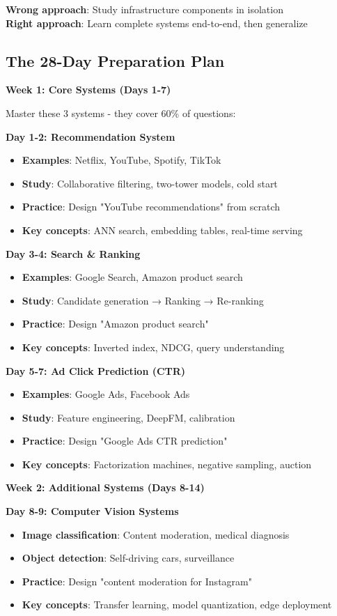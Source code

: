 \documentclass[10pt]{article}
\begin{document}
\textbf{Wrong approach}: Study infrastructure components in isolation \\
\textbf{Right approach}: Learn complete systems end-to-end, then generalize

\subsection{The 28-Day Preparation Plan}

\textbf{Week 1: Core Systems (Days 1-7)}

Master these 3 systems - they cover 60\% of questions:

\textbf{Day 1-2: Recommendation System}
\begin{itemize}
\item \textbf{Examples}: Netflix, YouTube, Spotify, TikTok
\item \textbf{Study}: Collaborative filtering, two-tower models, cold start
\item \textbf{Practice}: Design "YouTube recommendations" from scratch
\item \textbf{Key concepts}: ANN search, embedding tables, real-time serving
\end{itemize}

\textbf{Day 3-4: Search \& Ranking}
\begin{itemize}
\item \textbf{Examples}: Google Search, Amazon product search
\item \textbf{Study}: Candidate generation → Ranking → Re-ranking
\item \textbf{Practice}: Design "Amazon product search"
\item \textbf{Key concepts}: Inverted index, NDCG, query understanding
\end{itemize}

\textbf{Day 5-7: Ad Click Prediction (CTR)}
\begin{itemize}
\item \textbf{Examples}: Google Ads, Facebook Ads
\item \textbf{Study}: Feature engineering, DeepFM, calibration
\item \textbf{Practice}: Design "Google Ads CTR prediction"
\item \textbf{Key concepts}: Factorization machines, negative sampling, auction
\end{itemize}

\textbf{Week 2: Additional Systems (Days 8-14)}

\textbf{Day 8-9: Computer Vision Systems}
\begin{itemize}
\item \textbf{Image classification}: Content moderation, medical diagnosis
\item \textbf{Object detection}: Self-driving cars, surveillance
\item \textbf{Practice}: Design "content moderation for Instagram"
\item \textbf{Key concepts}: Transfer learning, model quantization, edge deployment
\end{itemize}
\end{document}
